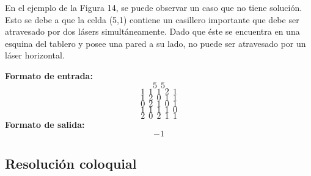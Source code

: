 \begin{itemize}
En el ejemplo de la Figura 14, se puede observar un caso que no tiene solución. Esto se debe a que la celda (5,1) contiene un casillero importante que debe ser atravesado por dos lásers simultáneamente. Dado que éste se encuentra en una esquina del tablero y posee una pared a su lado, no puede ser atravesado por un láser horizontal.

\textbf{Formato de entrada:} 
$$5\ \ 5$$
$$1\ \ 1\ \ 1\ \ 2\ \ 1$$
$$1\ \ 2\ \ 0\ \ 1\ \ 1$$
$$0\ \ 2\ \ 1\ \ 0\ \ 1$$
$$1\ \ 1\ \ 1\ \ 1\ \ 0$$
$$2\ \ 0\ \ 2\ \ 1\ \ 1$$
\textbf{Formato de salida:} $$-1$$\newline
\end{itemize}

\subsection{Resolución coloquial}

